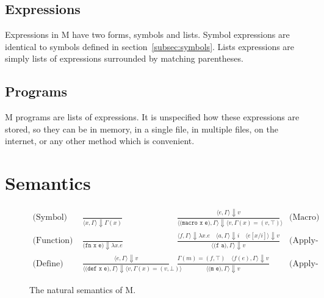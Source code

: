 \documentclass{article}
\newcommand{\comm}[1]{}
\begin{document}
\begin{multicols}{\comm{2}}
        \subsection{Expressions}\label{subsec:expressions}

        \begin{minipage}{\columnwidth}
            Expressions in M have two forms, symbols and lists.
            Symbol expressions are identical to symbols defined in section~\ref{subsec:symbols}.
            Lists expressions are simply lists of expressions surrounded by matching parentheses.
        \end{minipage}

        \subsection{Programs}\label{subsec:programs}

        \begin{minipage}{\columnwidth}
            M programs are lists of expressions.
            It is unspecified how these expressions are stored, so they can be in memory, in a single file, in multiple files, on the internet, or any other method which is convenient.
        \end{minipage}
    \end{multicols}
    \newpage

    \section{Semantics}\label{sec:semantics}

    \begin{figure}[h]
        \centering
        \begin{align*}
            \text{(Symbol)}\;&\frac{\;}{\langle x,\Gamma\rangle\Downarrow\Gamma(x)}
            &\frac{\langle e,\Gamma\rangle\Downarrow v}{\langle\texttt{(macro x e)},\Gamma\rangle\Downarrow\langle v,\Gamma(x) = (v,\top)\rangle}&\;\text{(Macro)}\\
            \text{(Function)}\;&\frac{\;}{\texttt{(fn x e)}\Downarrow\lambda x.e}
            &\frac{\langle f,\Gamma\rangle\Downarrow\lambda x.e\quad\langle a,\Gamma\rangle\Downarrow i\quad\langle e[x/i]\rangle\Downarrow v}{\langle\texttt{(f a)},\Gamma\rangle\Downarrow v}&\;\text{(Apply-Function)}\\
            \text{(Define)}\;&\frac{\langle e,\Gamma\rangle\Downarrow v}{\langle\texttt{(def x e)},\Gamma\rangle\Downarrow\langle v,\Gamma(x) = (v,\bot)\rangle}
            &\frac{\Gamma(m)=(f,\top)\quad\langle f(e),\Gamma\rangle\Downarrow v}{\langle\texttt{(m e)},\Gamma\rangle\Downarrow v}&\;\text{(Apply-Macro)}
        \end{align*}
        \caption{The natural semantics of M.}
    \end{figure}
\end{document}
